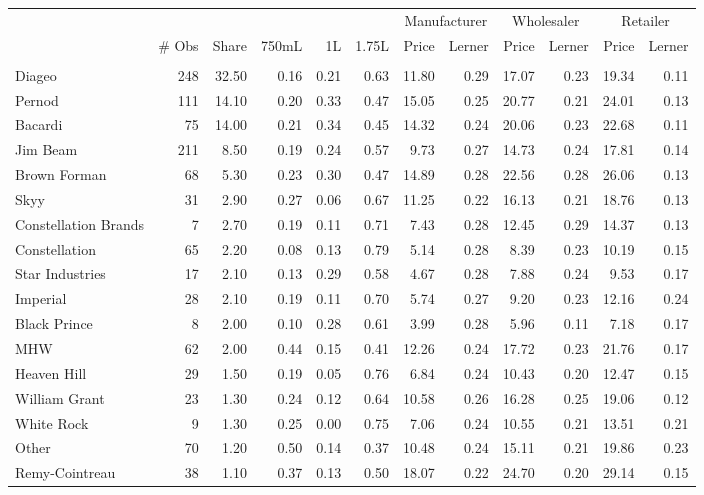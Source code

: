 \begin{tabular}{lrrrrrrrrrrr}
\toprule
 & & & & & &  \multicolumn{2}{c}{ Manufacturer } & \multicolumn{2}{c}{ Wholesaler }& \multicolumn{2}{c}{ Retailer } \\ 
 & \# Obs & Share & 750mL & 1L & 1.75L & Price & Lerner & Price & Lerner & Price & Lerner \\
 &  &  &  &  &  &  &  &  &  &  &  \\
\midrule
Diageo & 248 & 32.50 & 0.16 & 0.21 & 0.63 & 11.80 & 0.29 & 17.07 & 0.23 & 19.34 & 0.11 \\
Pernod & 111 & 14.10 & 0.20 & 0.33 & 0.47 & 15.05 & 0.25 & 20.77 & 0.21 & 24.01 & 0.13 \\
Bacardi & 75 & 14.00 & 0.21 & 0.34 & 0.45 & 14.32 & 0.24 & 20.06 & 0.23 & 22.68 & 0.11 \\
Jim Beam & 211 & 8.50 & 0.19 & 0.24 & 0.57 & 9.73 & 0.27 & 14.73 & 0.24 & 17.81 & 0.14 \\
Brown Forman & 68 & 5.30 & 0.23 & 0.30 & 0.47 & 14.89 & 0.28 & 22.56 & 0.28 & 26.06 & 0.13 \\
Skyy & 31 & 2.90 & 0.27 & 0.06 & 0.67 & 11.25 & 0.22 & 16.13 & 0.21 & 18.76 & 0.13 \\
Constellation Brands & 7 & 2.70 & 0.19 & 0.11 & 0.71 & 7.43 & 0.28 & 12.45 & 0.29 & 14.37 & 0.13 \\
Constellation & 65 & 2.20 & 0.08 & 0.13 & 0.79 & 5.14 & 0.28 & 8.39 & 0.23 & 10.19 & 0.15 \\
Star Industries & 17 & 2.10 & 0.13 & 0.29 & 0.58 & 4.67 & 0.28 & 7.88 & 0.24 & 9.53 & 0.17 \\
Imperial & 28 & 2.10 & 0.19 & 0.11 & 0.70 & 5.74 & 0.27 & 9.20 & 0.23 & 12.16 & 0.24 \\
Black Prince & 8 & 2.00 & 0.10 & 0.28 & 0.61 & 3.99 & 0.28 & 5.96 & 0.11 & 7.18 & 0.17 \\
MHW & 62 & 2.00 & 0.44 & 0.15 & 0.41 & 12.26 & 0.24 & 17.72 & 0.23 & 21.76 & 0.17 \\
Heaven Hill & 29 & 1.50 & 0.19 & 0.05 & 0.76 & 6.84 & 0.24 & 10.43 & 0.20 & 12.47 & 0.15 \\
William Grant & 23 & 1.30 & 0.24 & 0.12 & 0.64 & 10.58 & 0.26 & 16.28 & 0.25 & 19.06 & 0.12 \\
White Rock & 9 & 1.30 & 0.25 & 0.00 & 0.75 & 7.06 & 0.24 & 10.55 & 0.21 & 13.51 & 0.21 \\
Other & 70 & 1.20 & 0.50 & 0.14 & 0.37 & 10.48 & 0.24 & 15.11 & 0.21 & 19.86 & 0.23 \\
Remy-Cointreau & 38 & 1.10 & 0.37 & 0.13 & 0.50 & 18.07 & 0.22 & 24.70 & 0.20 & 29.14 & 0.15 \\

\end{tabular}
